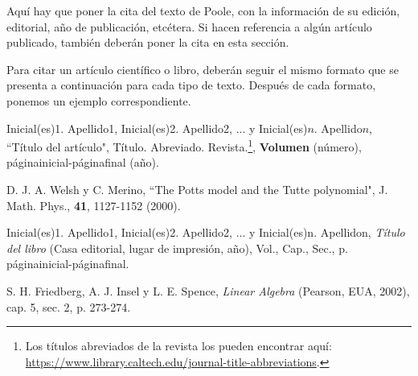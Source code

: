 \documentclass[letterpaper,12pt]{article}
\begin{document}
\begin{thebibliography}{100}

Aquí hay que poner la cita del texto de Poole, con la información de su edición, editorial, año de publicación, etcétera. Si hacen referencia a algún artículo publicado, también deberán poner la cita en esta sección.

Para citar un artículo científico o libro, deberán seguir el mismo formato que se presenta a continuación para cada tipo de texto. Después de cada formato, ponemos un ejemplo correspondiente.

Inicial(es)1. Apellido1, Inicial(es)2. Apellido2, ... y Inicial(es)$n$. Apellido$n$, ``Título del artículo", Título. Abreviado. Revista.\footnote{Los títulos abreviados de la revista los pueden encontrar aquí: \url{https://www.library.caltech.edu/journal-title-abbreviations}.}, \textbf{Volumen} (número), páginainicial-páginafinal (año).

 D. J. A. Welsh y C. Merino, ``The Potts model and the Tutte polynomial", J. Math. Phys., \textbf{41}, 1127-1152 (2000).

Inicial(es)1. Apellido1, Inicial(es)2. Apellido2, ... y Inicial(es)n. Apellidon, \textit{Título del libro} (Casa editorial, lugar de impresión, año), Vol., Cap., Sec., p. páginainicial-páginafinal.

S. H. Friedberg, A. J. Insel y L. E. Spence, \textit{Linear Algebra} (Pearson, EUA, 2002), cap. 5, sec. 2, p. 273-274.


\end{thebibliography}

\end{document}
